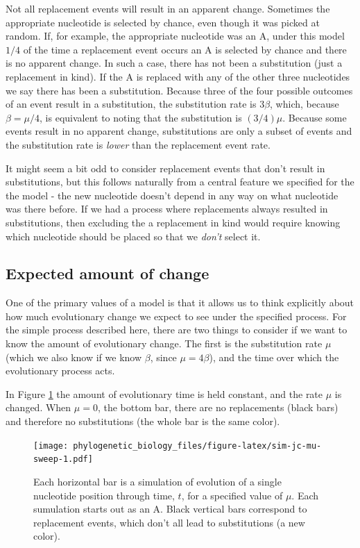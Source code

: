 \documentclass[
]{book}
\begin{document}
Not all replacement events will result in an apparent change. Sometimes the appropriate nucleotide is selected by chance, even though it was picked at random. If, for example, the appropriate nucleotide was an A, under this model \(1/4\) of the time a replacement event occurs an A is selected by chance and there is no apparent change. In such a case, there has not been a substitution (just a replacement in kind). If the A is replaced with any of the other three nucleotides we say there has been a substitution. Because three of the four possible outcomes of an event result in a substitution, the substitution rate is \(3\beta\), which, because \(\beta=\mu/4\), is equivalent to noting that the substitution is \((3/4) \mu\). Because some events result in no apparent change, substitutions are only a subset of events and the substitution rate is \emph{lower} than the replacement event rate.

It might seem a bit odd to consider replacement events that don't result in substitutions, but this follows naturally from a central feature we specified for the the model - the new nucleotide doesn't depend in any way on what nucleotide was there before. If we had a process where replacements always resulted in substitutions, then excluding the a replacement in kind would require knowing which nucleotide should be placed so that we \emph{don't} select it.

\hypertarget{expected-amount-of-change}{%
\subsection{Expected amount of change}\label{expected-amount-of-change}}

One of the primary values of a model is that it allows us to think explicitly about how much evolutionary change we expect to see under the specified process. For the simple process described here, there are two things to consider if we want to know the amount of evolutionary change. The first is the substitution rate \(\mu\) (which we also know if we know \(\beta\), since \(\mu=4\beta\)), and the time over which the evolutionary process acts.

In Figure \ref{fig:sim-jc-mu-sweep} the amount of evolutionary time is held constant, and the rate \(\mu\) is changed. When \(\mu=0\), the bottom bar, there are no replacements (black bars) and therefore no substitutions (the whole bar is the same color).

\begin{figure}
\centering
\texttt{[image: phylogenetic\_biology\_files/figure-latex/sim-jc-mu-sweep-1.pdf]}
\caption{\label{fig:sim-jc-mu-sweep}Each horizontal bar is a simulation of evolution of a single nucleotide position through time, \(t\), for a specified value of \(\mu\). Each sumulation starts out as an A. Black vertical bars correspond to replacement events, which don't all lead to substitutions (a new color).}
\end{figure}
\end{document}
